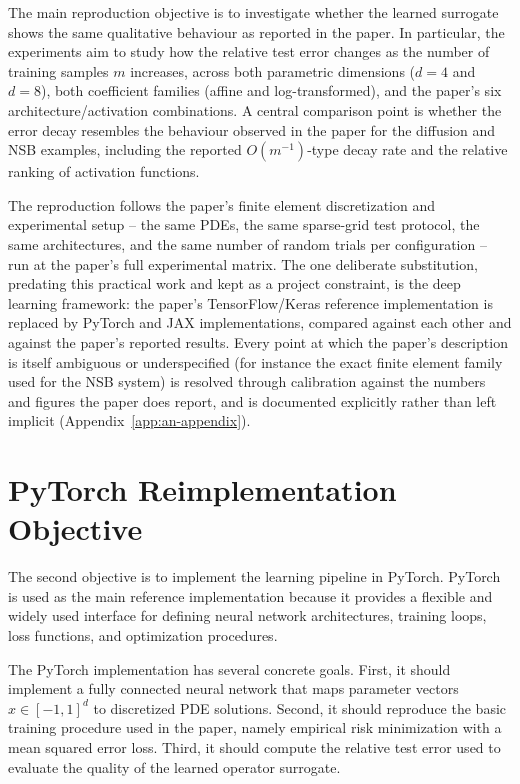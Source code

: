 The main reproduction objective is to investigate whether the learned surrogate shows the same qualitative behaviour as reported in the paper. In particular, the experiments aim to study how the relative test error changes as the number of training samples $m$ increases, across both parametric dimensions ($d=4$ and $d=8$), both coefficient families (affine and log-transformed), and the paper's six architecture/activation combinations. A central comparison point is whether the error decay resembles the behaviour observed in the paper for the diffusion and NSB examples, including the reported $O(m^{-1})$-type decay rate and the relative ranking of activation functions.

The reproduction follows the paper's finite element discretization and
experimental setup -- the same PDEs, the same sparse-grid test protocol, the
same architectures, and the same number of random trials per configuration
-- run at the paper's full experimental matrix. The one deliberate
substitution, predating this practical work and kept as a project
constraint, is the deep learning framework: the paper's TensorFlow/Keras
reference implementation is replaced by PyTorch and JAX implementations,
compared against each other and against the paper's reported results. Every
point at which the paper's description is itself ambiguous or
underspecified (for instance the exact finite element family used for the
NSB system) is resolved through calibration against the numbers and figures
the paper does report, and is documented explicitly rather than left
implicit (Appendix~\ref{app:an-appendix}).

\section{PyTorch Reimplementation Objective}
The second objective is to implement the learning pipeline in PyTorch. PyTorch is used as the main reference implementation because it provides a flexible and widely used interface for defining neural network architectures, training loops, loss functions, and optimization procedures.

The PyTorch implementation has several concrete goals. First, it should implement a fully connected neural network that maps parameter vectors
$x \in [-1,1]^d$ to discretized PDE solutions. Second, it should reproduce the basic training procedure used in the paper, namely empirical risk minimization with a mean squared error loss. Third, it should compute the relative test error used to evaluate the quality of the learned operator surrogate.

